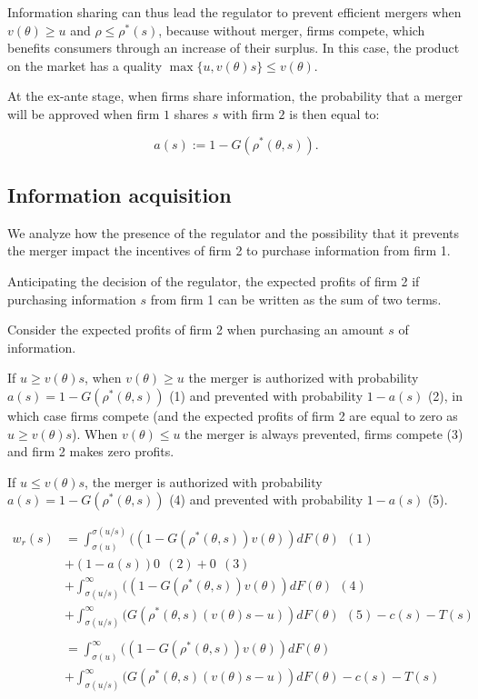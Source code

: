 \documentclass[a4paper,leqno]{article}%
\renewcommand{\t}{\theta}
\renewcommand{\t}{\theta}
\newcommand{\s}{\sigma}
\begin{document}
Information sharing can thus lead the regulator to prevent efficient mergers when $v(\t)\geq u$ and $\rho \leq \rho^*(s)$, because without merger, firms compete, which benefits consumers through an increase of their surplus. In this case, the product on the market has a quality $\max\{u,v(\t)s\}\leq v(\t)$.

At the ex-ante stage, when firms share information, the probability that a merger will be approved when firm $1$ shares $s$ with firm $2$ is then equal to:

\[
a(s):=1-G(\rho^*(\t,s)).
\]


\subsection{Information acquisition}

We analyze how the presence of the regulator and the possibility that it prevents the merger impact the incentives of firm 2 to purchase information from firm 1.

Anticipating the decision of the regulator, the expected profits of firm 2 if purchasing information $s$ from firm 1 can be written as the sum of two terms. 


Consider the expected profits of firm 2 when purchasing an amount $s$ of information.

If $u\geq v(\t)s$, when $v(\t)\geq u$ the merger is authorized with probability $a(s)=1-G(\rho^*(\t,s))$ (1) and prevented with probability $1-a(s)$ (2), in which case firms compete (and the expected profits of firm 2 are equal to zero as $u\geq v(\t)s$). When $v(\t)\leq u$ the merger is always prevented, firms compete (3) and firm 2 makes zero profits.

If $u\leq v(\t)s$, the merger is authorized with probability $a(s)=1-G(\rho^*(\t,s))$ (4) and prevented with probability $1-a(s)$ (5). 


\begin{equation}
    \begin{aligned}
w_r(s)&=\int_{\s(u)}^{\s(u/s)}((1-G(\rho^*(\t,s))v(\t))dF(\t)~~(1)\\ 
    &+(1-a(s))0~~(2)+0~~(3)\\
    &+\int_{\s(u/s)}^{\infty}((1-G(\rho^*(\t,s))v(\t))dF(\t)~~(4)\\
    &+\int_{\s(u/s)}^\infty (G(\rho^*(\t,s)(v(\t)s-u))dF(\t)~~(5)-c(s)-T(s)\\
    &\\
    &=\int_{\s(u)}^{\infty}((1-G(\rho^*(\t,s))v(\t))dF(\t)\\
    &+\int_{\s(u/s)}^\infty (G(\rho^*(\t,s)(v(\t)s-u))dF(\t)-c(s)-T(s)\\
\end{aligned}
\end{equation}
\end{document}

